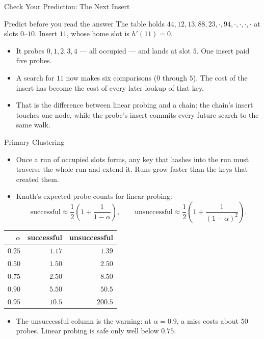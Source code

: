 \documentclass[aspectratio=169]{beamer}
\begin{document}
\begin{frame}{Check Your Prediction: The Next Insert}
  \begin{block}{Predict before you read the answer}
    The table holds $44,12,13,88,23,\cdot,94,\cdot,\cdot,\cdot,\cdot$ at
    slots $0$--$10$. Insert $11$, whose home slot is $h'(11)=0$.
  \end{block}
  \begin{itemize}
    \item It probes $0,1,2,3,4$ --- all occupied --- and lands at slot $5$.
      One insert paid five probes.
    \item A search for $11$ now makes six comparisons ($0$ through $5$).
      The cost of the insert has become the cost of every later lookup of
      that key.
    \item That is the difference between linear probing and a chain: the
      chain's insert touches one node, while the probe's insert commits every
      future search to the same walk.
  \end{itemize}
\end{frame}

\begin{frame}{Primary Clustering}
  \begin{itemize}
    \item Once a run of occupied slots forms, any key that hashes into the run
      must traverse the whole run and extend it. Runs grow faster than the
      keys that created them.
    \item Knuth's expected probe counts for linear probing:
      \[
        \text{successful} \approx \frac12\left(1+\frac{1}{1-\alpha}\right),
        \qquad
        \text{unsuccessful} \approx \frac12\left(1+\frac{1}{(1-\alpha)^2}\right).
      \]
  \end{itemize}
  \begin{center}
  {\footnotesize
  \begin{tabular}{r r r}
    \toprule
    $\alpha$ & successful & unsuccessful \\
    \midrule
    $0.25$ & $1.17$ & $1.39$ \\
    $0.50$ & $1.50$ & $2.50$ \\
    $0.75$ & $2.50$ & $8.50$ \\
    $0.90$ & $5.50$ & $50.5$ \\
    $0.95$ & $10.5$ & $200.5$ \\
    \bottomrule
  \end{tabular}}
  \end{center}
  \begin{itemize}
    \item The unsuccessful column is the warning: at $\alpha=0.9$, a miss costs
      about $50$ probes. Linear probing is safe only well below $0.75$.
  \end{itemize}
\end{frame}
\end{document}
